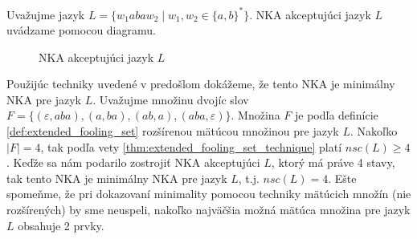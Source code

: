 \begin{example}
\normalfont Uvažujme jazyk $ L = \lbrace w_1abaw_2 \; | \; w_1,w_2 \in \lbrace a,b \rbrace^* \rbrace $. NKA akceptujúci jazyk $ L $ uvádzame pomocou diagramu.

\begin{figure}[H]
\centering
{}

\caption{NKA akceptujúci jazyk $ L $}
\end{figure}
Použijúc techniky uvedené v predošlom dokážeme, že tento NKA je minimálny NKA pre jazyk $ L $. Uvažujme množinu dvojíc slov $ F = \lbrace (\varepsilon, aba), (a,ba), (ab,a),(aba,\varepsilon) \rbrace $. Množina $ F $ je podľa definície \ref{def:extended_fooling_set} rozšírenou mätúcou množinou pre jazyk $ L $.  Nakoľko $ |F| = 4 $, tak podľa vety \ref{thm:extended_fooling_set_technique} platí $ nsc(L) \geq 4 $. Keďže sa nám podarilo zostrojiť NKA akceptujúci $ L $, ktorý má práve 4 stavy, tak tento NKA je minimálny NKA pre jazyk $ L $, t.j. $ nsc(L) = 4 $. Ešte spomeňme, že pri dokazovaní minimality pomocou techniky mätúcich množín (nie rozšírených) by sme neuspeli, nakoľko najväčšia možná mätúca množina pre jazyk $ L $ obsahuje 2 prvky.
\end{example}

